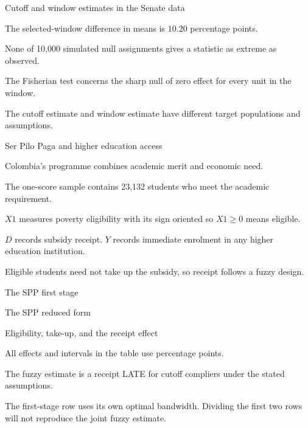 \begin{frame}{Cutoff and window estimates in the Senate data}

\begin{items}
\item The selected-window difference in means is $10.20$ percentage points.
\item None of 10,000 simulated null assignments gives a statistic as extreme as observed.
\item The Fisherian test concerns the sharp null of zero effect for every unit in the window.
\item The cutoff estimate and window estimate have different target populations and assumptions.
\end{items}
\end{frame}

\begin{frame}{Ser Pilo Paga and higher education access}
\begin{items}
\item Colombia's programme combines academic merit and economic need.
\item The one-score sample contains 23,132 students who meet the academic requirement.
\item $X1$ measures poverty eligibility with its sign oriented so $X1\geq0$ means eligible.
\item $D$ records subsidy receipt. $Y$ records immediate enrolment in any higher education institution.
\item Eligible students need not take up the subsidy, so receipt follows a fuzzy design.
\end{items}
\end{frame}

\begin{frame}{The SPP first stage}
\end{frame}

\begin{frame}{The SPP reduced form}
\end{frame}

\begin{frame}{Eligibility, take-up, and the receipt effect}

\begin{items}
\item All effects and intervals in the table use percentage points.
\item The fuzzy estimate is a receipt LATE for cutoff compliers under the stated assumptions.
\item The first-stage row uses its own optimal bandwidth. Dividing the first two rows will not reproduce the joint fuzzy estimate.
\end{items}
\end{frame}

